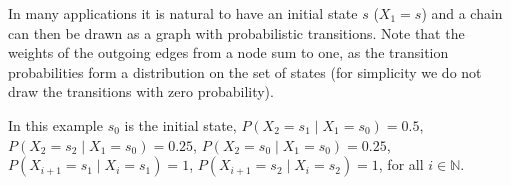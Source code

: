 In many applications it is natural to have an initial state
$s$ ($X_1 = s$) and a chain can
then be drawn as a graph with probabilistic transitions. Note
that the weights of the outgoing edges from a node sum to one, as the
transition probabilities form a distribution on the set of states (for
simplicity we do not draw the transitions with zero probability).

\begin{example}
    \label{ex_mc}
    In this example $s_0$ is the initial state,
    $P(X_2 = s_1 \mid X_1 = s_0) = 0.5$,
    $P(X_2 = s_2 \mid X_1 = s_0) = 0.25$,
    $P(X_2 = s_0 \mid X_1 = s_0) = 0.25$,
    $P(X_{i+1} = s_1 \mid X_{i} = s_1) = 1$,
    $P(X_{i+1} = s_2 \mid X_{i} = s_2) = 1$,
    for all $i \in \mathbb{N}$.

\hfill \break
\centering
{}
\end{example}

